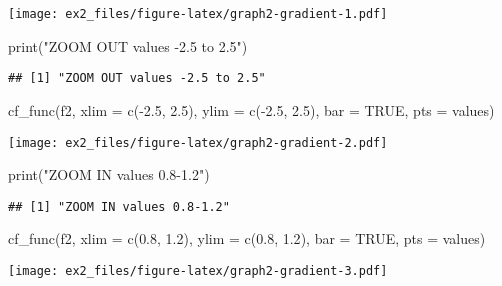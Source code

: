 \documentclass[
]{article}
\newenvironment{Shaded}{\begin{snugshade}}{\end{snugshade}}
\newcommand{\AttributeTok}[1]{\textcolor[rgb]{0.77,0.63,0.00}{#1}}
\newcommand{\ConstantTok}[1]{\textcolor[rgb]{0.00,0.00,0.00}{#1}}
\newcommand{\FloatTok}[1]{\textcolor[rgb]{0.00,0.00,0.81}{#1}}
\newcommand{\FunctionTok}[1]{\textcolor[rgb]{0.00,0.00,0.00}{#1}}
\newcommand{\NormalTok}[1]{#1}
\newcommand{\SpecialCharTok}[1]{\textcolor[rgb]{0.00,0.00,0.00}{#1}}
\newcommand{\StringTok}[1]{\textcolor[rgb]{0.31,0.60,0.02}{#1}}
\begin{document}
\texttt{[image: ex2\_files/figure-latex/graph2-gradient-1.pdf]}

\begin{Shaded}
\begin{Highlighting}[]
\FunctionTok{print}\NormalTok{(}\StringTok{"ZOOM OUT values {-}2.5 to 2.5"}\NormalTok{)}
\end{Highlighting}
\end{Shaded}

\begin{verbatim}
## [1] "ZOOM OUT values -2.5 to 2.5"
\end{verbatim}

\begin{Shaded}
\begin{Highlighting}[]
\FunctionTok{cf\_func}\NormalTok{(f2, }\AttributeTok{xlim =} \FunctionTok{c}\NormalTok{(}\SpecialCharTok{{-}}\FloatTok{2.5}\NormalTok{, }\FloatTok{2.5}\NormalTok{), }\AttributeTok{ylim =} \FunctionTok{c}\NormalTok{(}\SpecialCharTok{{-}}\FloatTok{2.5}\NormalTok{, }\FloatTok{2.5}\NormalTok{), }\AttributeTok{bar =} \ConstantTok{TRUE}\NormalTok{, }\AttributeTok{pts =}\NormalTok{ values)}
\end{Highlighting}
\end{Shaded}

\texttt{[image: ex2\_files/figure-latex/graph2-gradient-2.pdf]}

\begin{Shaded}
\begin{Highlighting}[]
\FunctionTok{print}\NormalTok{(}\StringTok{"ZOOM IN values 0.8{-}1.2"}\NormalTok{)}
\end{Highlighting}
\end{Shaded}

\begin{verbatim}
## [1] "ZOOM IN values 0.8-1.2"
\end{verbatim}

\begin{Shaded}
\begin{Highlighting}[]
\FunctionTok{cf\_func}\NormalTok{(f2, }\AttributeTok{xlim =} \FunctionTok{c}\NormalTok{(}\FloatTok{0.8}\NormalTok{, }\FloatTok{1.2}\NormalTok{), }\AttributeTok{ylim =} \FunctionTok{c}\NormalTok{(}\FloatTok{0.8}\NormalTok{, }\FloatTok{1.2}\NormalTok{), }\AttributeTok{bar =} \ConstantTok{TRUE}\NormalTok{, }\AttributeTok{pts =}\NormalTok{ values)}
\end{Highlighting}
\end{Shaded}

\texttt{[image: ex2\_files/figure-latex/graph2-gradient-3.pdf]}
\end{document}

